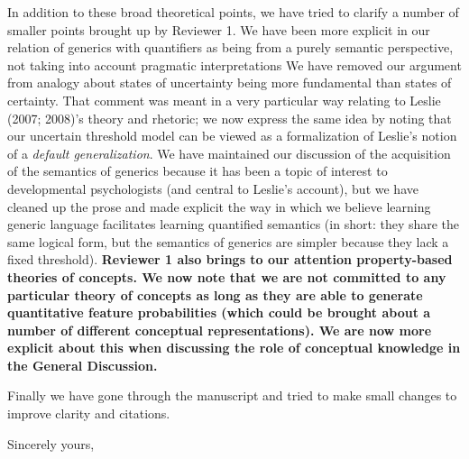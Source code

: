 \documentclass[11pt,letterpaper]{letter} %
\newcommand{\ndg}[1]{{\color{green}{[ndg: #1]}}}
\newcommand{\mht}[1]{{\color{blue}{[mht: #1]}}}
\begin{document}
\begin{letter}
In addition to these broad theoretical points, we have tried to clarify a number of smaller points brought up by Reviewer 1.
We have been more explicit in our relation of generics with quantifiers as being from a purely semantic perspective, not taking into account pragmatic interpretations
We have removed our argument from analogy about states of uncertainty being more fundamental than states of certainty.
That comment was meant in a very particular way relating to Leslie (2007; 2008)'s theory and rhetoric; we now express the same idea by noting that our uncertain threshold model can be viewed as a formalization of Leslie's notion of a \emph{default generalization}. 
We have maintained our discussion of the acquisition of the semantics of generics because it has been a topic of interest to developmental psychologists (and central to Leslie's account), but we have cleaned up the prose and made explicit the way in which we believe learning generic language facilitates learning quantified semantics (in short: they share the same logical form, but the semantics of generics are simpler because they lack a fixed threshold).
\textbf{Reviewer 1 also brings to our attention property-based theories of concepts. We now note that we are not committed to any particular theory of concepts as long as they are able to generate quantitative feature probabilities (which could be brought about a number of different conceptual representations).  
We are now more explicit about this when discussing the role of conceptual knowledge in the General Discussion. }

Finally we have gone through the manuscript and tried to make small changes to improve clarity and citations.



\closing{Sincerely yours,}

\end{letter}
\end{document}
